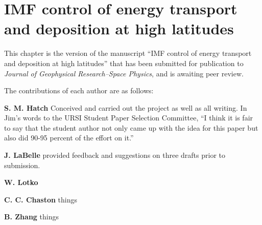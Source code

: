 
\chapter{IMF control of \Alfic energy transport and deposition at high latitudes}
\label{chp:4}

This chapter is the version of the manuscript ``IMF control of \Alfic
energy transport and deposition at high latitudes'' that has been
submitted for publication to \textsl{Journal of Geophysical
  Research--Space Physics}, and is awaiting peer review.

The contributions of each author are as follows:

\textbf{S. M. Hatch} Conceived and carried out the project as well as
all writing. In Jim's words to the URSI Student Paper Selection
Committee, ``I think it is fair to say that the student author not
only came up with the idea for this paper but also did 90-95 percent
of the effort on it.''

\textbf{J. LaBelle} provided feedback and suggestions on three drafts
prior to submission.

\textbf{W. Lotko} 

\textbf{C. C. Chaston} things

\textbf{B. Zhang} things



